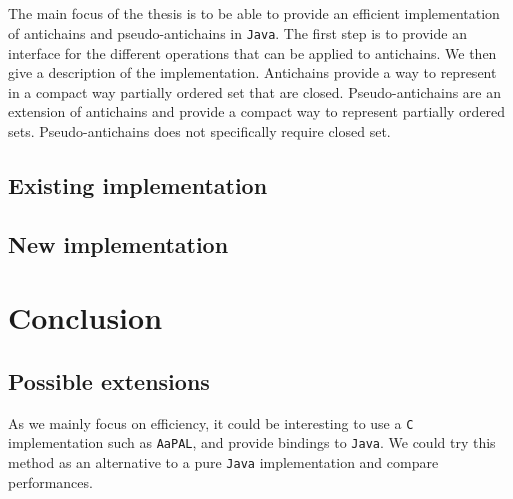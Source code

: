 \documentclass[letterpaper]{memoir}
\begin{document}
\paragraph{}


The main focus of the thesis is to be able to provide an efficient
implementation of antichains and pseudo-antichains in \texttt{Java}.
The first step is to provide an interface for the different operations that
can be applied to antichains. We then give a description of the implementation.
Antichains provide a way to represent
in a compact way partially ordered set that are closed. Pseudo-antichains
are an extension of antichains and provide a compact way to represent
partially ordered sets. Pseudo-antichains does not specifically require
closed set.



\section{Existing implementation}



\section{New implementation}


\chapter{Conclusion}


\section{Possible extensions}


As we mainly focus on efficiency, it could be interesting to use a \texttt{C}
implementation such as \texttt{AaPAL},
and provide bindings to \texttt{Java}. We could try
this method as an alternative to a pure \texttt{Java} implementation and
compare performances.





\end{document}
